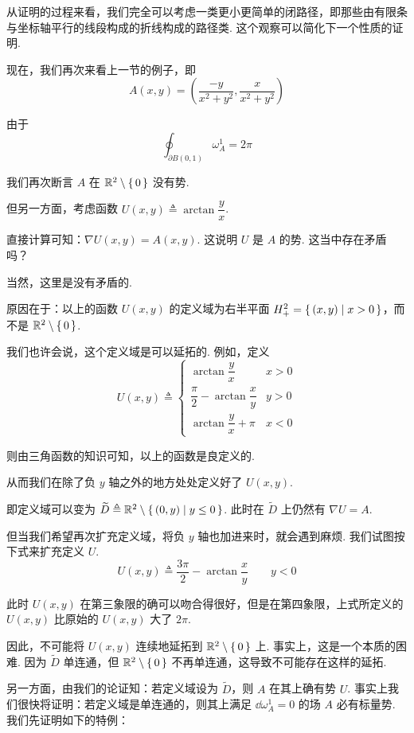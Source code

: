 \begin{hint}
    从证明的过程来看，我们完全可以考虑一类更小更简单的闭路径，即那些由有限条与坐标轴平行的线段构成的折线构成的路径类. 这个观察可以简化下一个性质的证明.
\end{hint}

现在，我们再次来看上一节的例子，即
$$
A(x,y)=\left(\frac{-y}{x^2+y^2},\frac{x}{x^2+y^2}\right)
$$

由于
$$
\oint_{\partial B(0,1)}\omega_A^1=2\pi
$$

我们再次断言 $A$ 在 $\mathbb{R}^2\setminus\set{0}$ 没有势.

但另一方面，考虑函数 $U(x,y)\triangleq\arctan\dfrac{y}{x}$.

直接计算可知：$\nabla U(x,y)=A(x,y)$. 这说明 $U$ 是 $A$ 的势. 这当中存在矛盾吗？

当然，这里是没有矛盾的.

原因在于：以上的函数 $U(x,y)$ 的定义域为右半平面 $H^2_+=\set{(x,y)|x>0}$，而不是 $\mathbb{R}^2\setminus\set{0}$.


我们也许会说，这个定义域是可以延拓的. 例如，定义
$$
U(x,y)\triangleq\begin{cases}
    \arctan\dfrac{y}{x} & x>0\\
    \dfrac{\pi}{2}-\arctan\dfrac{x}{y} & y>0\\
    \arctan\dfrac{y}{x}+\pi & x<0
\end{cases}
$$

则由三角函数的知识可知，以上的函数是良定义的.

从而我们在除了负 $y$ 轴之外的地方处处定义好了 $U(x,y)$.

即定义域可以变为 $\widetilde{D}\triangleq\mathbb{R}^2\setminus\set{(0,y)|y\le 0}$. 此时在 $\widetilde{D}$ 上仍然有 $\nabla U=A$.

但当我们希望再次扩充定义域，将负 $y$ 轴也加进来时，就会遇到麻烦. 我们试图按下式来扩充定义 $U$.
$$
U(x,y)\triangleq\dfrac{3\pi}{2}-\arctan\frac{x}{y}\qquad y<0
$$

此时 $U(x,y)$ 在第三象限的确可以吻合得很好，但是在第四象限，上式所定义的 $U(x,y)$ 比原始的 $U(x,y)$ 大了 $2\pi$.

因此，不可能将 $U(x,y)$ 连续地延拓到 $\mathbb{R}^2\setminus\set{0}$ 上. 事实上，这是一个本质的困难. 因为 $\widetilde{D}$ 单连通，但 $\mathbb{R}^2\setminus\set{0}$ 不再单连通，这导致不可能存在这样的延拓.

另一方面，由我们的论证知：若定义域设为 $\widetilde{D}$，则 $A$ 在其上确有势 $U$. 事实上我们很快将证明：若定义域是单连通的，则其上满足 $\dd\omega_A^1=0$ 的场 $A$ 必有标量势. 我们先证明如下的特例：

